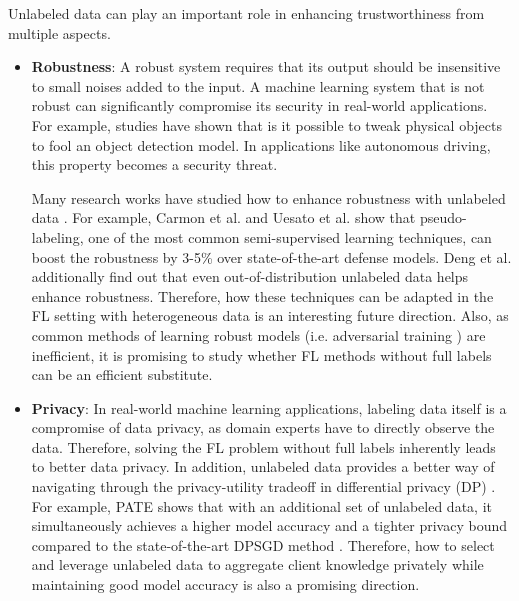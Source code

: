 \documentclass[11pt]{article}
\begin{document}
Unlabeled data can play an important role in enhancing trustworthiness from multiple aspects.
\begin{itemize}
    \item \textbf{Robustness}: A robust system requires that its output should be insensitive to small noises added to the input. A machine learning system that is not robust can significantly compromise its security in real-world applications. For example, studies \cite{Yilun-kurakin2018adversarial} have shown that is it possible to tweak physical objects to fool an object detection model. In applications like autonomous driving, this property becomes a security threat.

    Many research works have studied how to enhance robustness with unlabeled data \cite{Yilun-deng2021improving,Yilun-carmon2019unlabeled}. For example, Carmon et al. and Uesato et al. \cite{Yilun-carmon2019unlabeled,Yilun-alayrac2019labels} show that pseudo-labeling, one of the most common semi-supervised learning techniques, can boost the robustness by 3-5\% over state-of-the-art defense models. Deng et al. \cite{Yilun-deng2021improving} additionally find out that even out-of-distribution unlabeled data helps enhance robustness. Therefore, how these techniques can be adapted in the FL setting with heterogeneous data is an interesting future direction. Also, as common methods of learning robust models (i.e. adversarial training \cite{Yilun-madry2018towards}) are inefficient, it is promising to study whether FL methods without full labels can be an efficient substitute.

    \item \textbf{Privacy}: In real-world machine learning applications, labeling data itself is a compromise of data privacy, as domain experts have to directly observe the data. Therefore, solving the FL problem without full labels inherently leads to better data privacy. In addition, unlabeled data provides a better way of navigating through the privacy-utility tradeoff in differential privacy (DP) \cite{Yilun-dwork2014algorithmic}. For example, PATE \cite{Yilun-papernot2017semi} shows that with an additional set of unlabeled data, it simultaneously achieves a higher model accuracy and a tighter privacy bound compared to the state-of-the-art DPSGD method \cite{Yilun-abadi2016deep}. Therefore, how to select and leverage unlabeled data to aggregate client knowledge privately while maintaining good model accuracy is also a promising direction.


\end{itemize}
\end{document}
